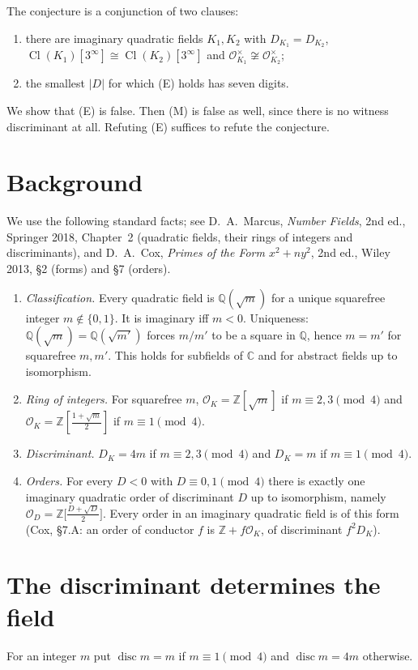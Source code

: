 \documentclass[11pt]{article}
\theoremstyle{definition}
\theoremstyle{remark}
\newcommand{\Q}{\mathbb{Q}}
\newcommand{\Z}{\mathbb{Z}}
\newcommand{\C}{\mathbb{C}}
\newcommand{\OO}{\mathcal{O}}
\newcommand{\disc}{\operatorname{disc}}
\newcommand{\Cl}{\operatorname{Cl}}
\begin{document}
The conjecture is a conjunction of two clauses:
\begin{enumerate}
\item[(E)] there are imaginary quadratic fields $K_1,K_2$ with $D_{K_1}=D_{K_2}$,
$\Cl(K_1)[3^\infty]\cong\Cl(K_2)[3^\infty]$ and $\OO_{K_1}^\times\not\cong\OO_{K_2}^\times$;
\item[(M)] the smallest $|D|$ for which (E) holds has seven digits.
\end{enumerate}
We show that (E) is false. Then (M) is false as well, since there is no witness discriminant at
all. Refuting (E) suffices to refute the conjecture.

\section{Background}
We use the following standard facts; see D.~A.~Marcus, \emph{Number Fields}, 2nd ed., Springer
2018, Chapter~2 (quadratic fields, their rings of integers and discriminants), and D.~A.~Cox,
\emph{Primes of the Form $x^2+ny^2$}, 2nd ed., Wiley 2013, \S2 (forms) and \S7 (orders).

\begin{enumerate}
\item[(F1)] \emph{Classification.} Every quadratic field is $\Q(\sqrt m)$ for a unique squarefree
integer $m\notin\{0,1\}$. It is imaginary iff $m<0$. Uniqueness: $\Q(\sqrt m)=\Q(\sqrt{m'})$
forces $m/m'$ to be a square in $\Q$, hence $m=m'$ for squarefree $m,m'$. This holds for
subfields of $\C$ and for abstract fields up to isomorphism.
\item[(F2)] \emph{Ring of integers.} For squarefree $m$, $\OO_K=\Z[\sqrt m]$ if
$m\equiv 2,3\pmod 4$ and $\OO_K=\Z[\tfrac{1+\sqrt m}{2}]$ if $m\equiv1\pmod 4$.
\item[(F3)] \emph{Discriminant.} $D_K=4m$ if $m\equiv2,3\pmod4$ and $D_K=m$ if $m\equiv1\pmod4$.
\item[(F4)] \emph{Orders.} For every $D<0$ with $D\equiv0,1\pmod 4$ there is exactly one
imaginary quadratic order of discriminant $D$ up to isomorphism, namely
$\OO_D=\Z\big[\tfrac{D+\sqrt D}{2}\big]$. Every order in an imaginary quadratic field is of this
form (Cox, \S7.A: an order of conductor $f$ is $\Z+f\OO_K$, of discriminant $f^2D_K$).
\end{enumerate}

\section{The discriminant determines the field}
For an integer $m$ put $\disc m=m$ if $m\equiv1\pmod 4$ and $\disc m=4m$ otherwise.
\end{document}

